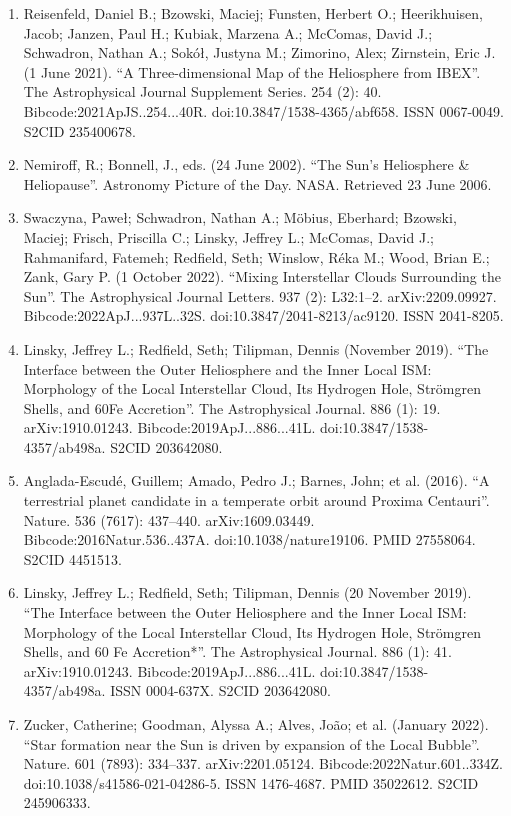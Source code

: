 \begin{enumerate}
\item Reisenfeld, Daniel B.; Bzowski, Maciej; Funsten, Herbert O.; Heerikhuisen, Jacob; Janzen, Paul H.; Kubiak, Marzena A.; McComas, David J.; Schwadron, Nathan A.; Sokół, Justyna M.; Zimorino, Alex; Zirnstein, Eric J. (1 June 2021). ``A Three-dimensional Map of the Heliosphere from IBEX''. The Astrophysical Journal Supplement Series. 254 (2): 40. Bibcode:2021ApJS..254...40R. doi:10.3847/1538-4365/abf658. ISSN 0067-0049. S2CID 235400678.
\item Nemiroff, R.; Bonnell, J., eds. (24 June 2002). ``The Sun's Heliosphere \& Heliopause''. Astronomy Picture of the Day. NASA. Retrieved 23 June 2006.
\item Swaczyna, Paweł; Schwadron, Nathan A.; Möbius, Eberhard; Bzowski, Maciej; Frisch, Priscilla C.; Linsky, Jeffrey L.; McComas, David J.; Rahmanifard, Fatemeh; Redfield, Seth; Winslow, Réka M.; Wood, Brian E.; Zank, Gary P. (1 October 2022). ``Mixing Interstellar Clouds Surrounding the Sun''. The Astrophysical Journal Letters. 937 (2): L32:1–2. arXiv:2209.09927. Bibcode:2022ApJ...937L..32S. doi:10.3847/2041-8213/ac9120. ISSN 2041-8205.
\item Linsky, Jeffrey L.; Redfield, Seth; Tilipman, Dennis (November 2019). ``The Interface between the Outer Heliosphere and the Inner Local ISM: Morphology of the Local Interstellar Cloud, Its Hydrogen Hole, Strömgren Shells, and 60Fe Accretion''. The Astrophysical Journal. 886 (1): 19. arXiv:1910.01243. Bibcode:2019ApJ...886...41L. doi:10.3847/1538-4357/ab498a. S2CID 203642080.
\item Anglada-Escudé, Guillem; Amado, Pedro J.; Barnes, John; et al. (2016). ``A terrestrial planet candidate in a temperate orbit around Proxima Centauri''. Nature. 536 (7617): 437–440. arXiv:1609.03449. Bibcode:2016Natur.536..437A. doi:10.1038/nature19106. PMID 27558064. S2CID 4451513.
\item Linsky, Jeffrey L.; Redfield, Seth; Tilipman, Dennis (20 November 2019). ``The Interface between the Outer Heliosphere and the Inner Local ISM: Morphology of the Local Interstellar Cloud, Its Hydrogen Hole, Strömgren Shells, and 60 Fe Accretion*''. The Astrophysical Journal. 886 (1): 41. arXiv:1910.01243. Bibcode:2019ApJ...886...41L. doi:10.3847/1538-4357/ab498a. ISSN 0004-637X. S2CID 203642080.
\item Zucker, Catherine; Goodman, Alyssa A.; Alves, João; et al. (January 2022). ``Star formation near the Sun is driven by expansion of the Local Bubble''. Nature. 601 (7893): 334–337. arXiv:2201.05124. Bibcode:2022Natur.601..334Z. doi:10.1038/s41586-021-04286-5. ISSN 1476-4687. PMID 35022612. S2CID 245906333.

\end{enumerate}
